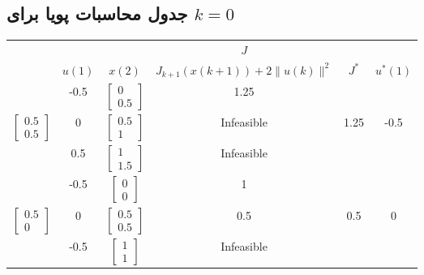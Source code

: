 \subsection*{جدول محاسبات پویا برای \( k = 0 \)}
\begin{latin}
	\begin{longtable}{|c|c|c|c|c|c|}
		\hline
		\rowcolor[HTML]{00D2CB} 
		& 	 & 	 & $J$ &	 &	\\
		\rowcolor[HTML]{00D2CB} 
		\multirow{-2}{*}{$x(1)$}	&\multirow{-2}{*}{$u(1)$ }	&\multirow{-2}{*}{$x(2)$}	& $J_{k+1}(x(k+1)) + 2\|u(k)\|^2$ &\multirow{-2}{*}{$J^*$}	& \multirow{-2}{*}{$u^*(1)$}\\ \hline
		\endfirsthead                                             
		\endhead
		&-0.5&$\begin{bmatrix} 0 \\ 0.5 \end{bmatrix}$&1.25&	&	\\  \cline{2-4} 
		\multirow{-3}{*}{$\begin{bmatrix} 0.5 \\ 0.5 \end{bmatrix}$}&0&$\begin{bmatrix} 0.5 \\ 1 \end{bmatrix}$&Infeasible&1.25&-0.5	\\  \cline{2-4} 		
		&0.5&$\begin{bmatrix} 1 \\ 1.5 \end{bmatrix}$&Infeasible&	&	\\  \cline{2-4} \hline
		
		&      -0.5                  &$\begin{bmatrix} 0 \\ 0 \end{bmatrix}$      &    1 &             &   \\  \cline{2-4} 
		\multirow{-3}{*}{$\begin{bmatrix} 0.5 \\ 0 \end{bmatrix}$}&        0                &$\begin{bmatrix} 0.5 \\ 0.5 \end{bmatrix}$      &      0.5                  &    0.5     &  $0$   \\  \cline{2-4} 
		&         -0.5               &$\begin{bmatrix} 1 \\ 1 \end{bmatrix}$      & Infeasible                        &              &   \\  \cline{2-4} \hline
		

\end{longtable}
\end{latin}
